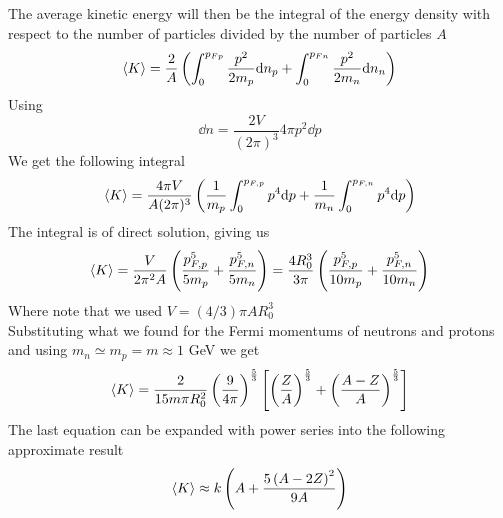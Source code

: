 \documentclass[../qm.tex]{subfiles}
\begin{document}
The average kinetic energy will then be the integral of the energy density with respect to the number of particles divided by the number of particles $A$
\begin{equation}
	\expval{K}=\frac{2}{A}\left( \int_{0}^{p_{Fp}}\frac{p^2}{2m_p}\dd n_p+\int_{0}^{p_{Fn}}\frac{p^2}{2m_n}\dd n_n \right)
	\label{eq:expvalKnuc}
\end{equation}
Using
\begin{equation*}
	\dd n=\frac{2V}{(2\pi)^3}4\pi p^2\dd p
\end{equation*}
We get the following integral
\begin{equation}
	\expval{K}=\frac{4\pi V}{A(2\pi)^3}\left( \frac{1}{m_p}\int_{0}^{p_{F,p}}p^4\dd p+\frac{1}{m_n}\int_{0}^{p_{F,n}}p^4\dd p \right)
	\label{eq:averageknuclear}
\end{equation}
The integral is of direct solution, giving us
\begin{equation}
	\expval{K}=\frac{V}{2\pi^2 A}\left( \frac{p_{F,p}^5}{5m_p}+\frac{p_{F,n}^5}{5m_n} \right)=\frac{4R_0^3}{3\pi}\left( \frac{p_{F,p}^5}{10m_p}+\frac{p_{F,n}^5}{10m_n} \right)
	\label{eq:expKnuc}
\end{equation}
Where note that we used $V=(4/3)\pi AR_0^3$\\
Substituting what we found for the Fermi momentums of neutrons and protons and using $m_n\simeq m_p=m\approx1$ GeV we get
\begin{equation}
	\expval{K}=\frac{2}{15m\pi R_0^2}\left( \frac{9}{4\pi} \right)^{\frac{5}{3}}\left[ \left( \frac{Z}{A} \right)^{\frac{5}{3}}+\left( \frac{A-Z}{A} \right)^{\frac{5}{3}} \right]
	\label{eq:expKnucfin}
\end{equation}
The last equation can be expanded with power series into the following approximate result
\begin{equation}
	\expval{K}\approx k\left( A+\frac{5\left( A-2Z \right)^2}{9A} \right)
	\label{eq:approxKferminuc}
\end{equation}
\end{document}
